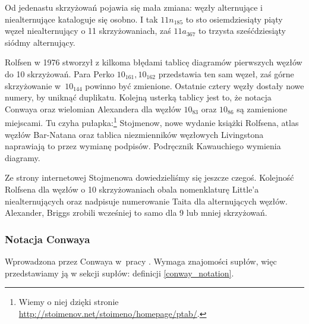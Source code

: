 Od jedenastu skrzyżowań pojawia się mała zmiana: węzły alternujące i niealternujące kataloguje się osobno.
I tak $11n_{185}$ to sto osiemdziesiąty piąty węzeł niealternujący o 11 skrzyżowaniach, zaś $11a_{367}$ to trzysta sześćdziesiąty siódmy alternujący.

Rolfsen w 1976 stworzył z kilkoma błędami tablicę diagramów pierwszych węzłów do 10 skrzyżowań.
Para Perko $10_{161}, 10_{162}$ przedstawia ten sam węzeł, zaś górne skrzyżowanie w~$10_{144}$ powinno być zmienione.
Ostatnie cztery węzły dostały nowe numery, by uniknąć duplikatu.
Kolejną usterką tablicy jest to, że notacja Conwaya oraz wielomian Alexandera dla węzłów $10_{83}$ oraz $10_{86}$ są zamienione miejscami.
Tu czyha pułapka:\footnote{Wiemy o niej dzięki stronie \url{http://stoimenov.net/stoimeno/homepage/ptab/}.} Stojmenow, nowe wydanie książki Rolfsena, atlas węzłów Bar-Natana oraz tablica niezmienników węzłowych Livingstona naprawiają to przez wymianę podpisów.
Podręcznik Kawauchiego wymienia diagramy.

Ze strony internetowej Stojmenowa dowiedzieliśmy się jeszcze czegoś.
Kolejność Rolfsena dla węzłów o 10 skrzyżowaniach obala nomenklaturę Little'a niealternujących oraz nadpisuje numerowanie Taita dla alternujących węzłów.
Alexander, Briggs zrobili wcześniej to samo dla 9 lub mniej skrzyżowań.

%

\subsubsection{Notacja Conwaya}
%
Wprowadzona przez Conwaya w~pracy \cite{conway70}.
Wymaga znajomości supłów, więc przedstawiamy ją w sekcji supłów: definicji \ref{conway_notation}.

